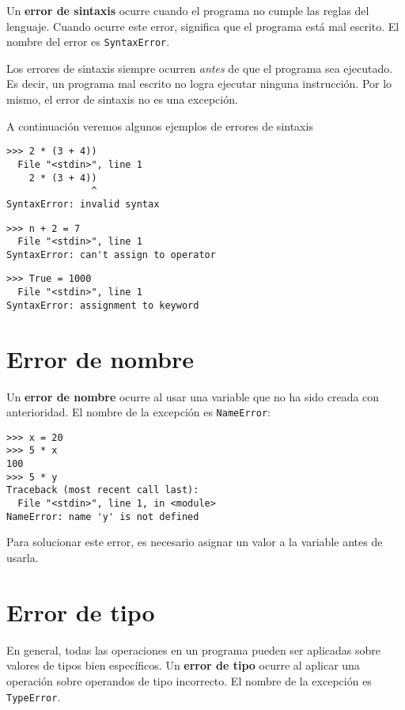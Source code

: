 Un \textbf{error de sintaxis} ocurre cuando el programa no cumple las
reglas del lenguaje. Cuando ocurre este error, significa que el programa
está mal escrito. El nombre del error es \lstinline!SyntaxError!.

Los errores de sintaxis siempre ocurren \emph{antes} de que el programa
sea ejecutado. Es decir, un programa mal escrito no logra ejecutar
ninguna instrucción. Por lo mismo, el error de sintaxis no es una
excepción.

A continuación veremos algunos ejemplos de errores de sintaxis

\begin{lstlisting}
>>> 2 * (3 + 4))
  File "<stdin>", line 1
    2 * (3 + 4))
               ^
SyntaxError: invalid syntax
\end{lstlisting}

\begin{lstlisting}
>>> n + 2 = 7
  File "<stdin>", line 1
SyntaxError: can't assign to operator
\end{lstlisting}

\begin{lstlisting}
>>> True = 1000
  File "<stdin>", line 1
SyntaxError: assignment to keyword
\end{lstlisting}

\section{Error de nombre}

Un \textbf{error de nombre} ocurre al usar una variable que no ha sido
creada con anterioridad.
El nombre de la excepción es \lstinline!NameError!:
\begin{lstlisting}
>>> x = 20
>>> 5 * x
100
>>> 5 * y
Traceback (most recent call last):
  File "<stdin>", line 1, in <module>
NameError: name 'y' is not defined
\end{lstlisting}

Para solucionar este error, es necesario asignar un valor a la variable
antes de usarla.

\section{Error de tipo}

En general, todas las operaciones en un programa pueden ser aplicadas
sobre valores de tipos bien específicos. Un \textbf{error de tipo}
ocurre al aplicar una operación sobre operandos de tipo incorrecto.
El nombre de la excepción es \lstinline!TypeError!.

